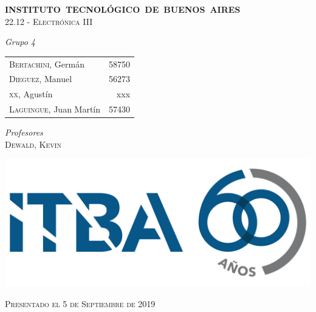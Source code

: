 \begin{titlepage}
    \newcommand{\HRule}{\rule{\linewidth}{0.5mm}}
    \begin{center}
    \mbox{\textsc{\large \bfseries {INSTITUTO TECNOLÓGICO DE BUENOS AIRES}}}\\[1cm]
    \textsc{\Large 22.12 - Electrónica III}\\[0.5cm]
    
    
    
    \large
    
    \emph{\Large Grupo 4}\\
    \vspace{10px}
    
    \begin{tabular}{lr}
    \textsc{Bertachini}, Germán  & 58750 \\ 	
    \textsc{Dieguez}, Manuel  & 56273 \\
    \textsc{xx}, Agustín  & xxx \\
    \textsc{Laguingue}, Juan Martín  & 57430 \\
    \end{tabular}
    \emph{Profesores}\\
    \vspace{3px}
    \textsc{Dewald, Kevin\\}
    \vspace{100px}

    \vspace{20px}

    \includegraphics[scale=0.6]{ITBA.png}    

    
    
    \vspace{80px}
    
    \textsc{\large Presentado el 5 de Septiembre de 2019}\\
    
    \end{center}
    
    \end{titlepage}